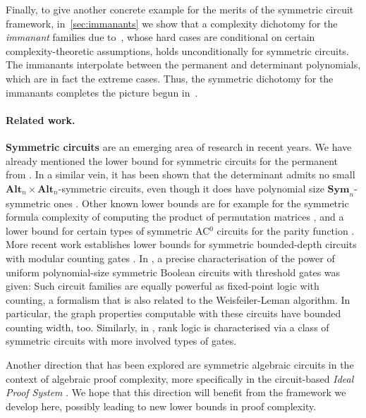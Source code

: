 \documentclass[11pt, DIV=15]{scrarticle}
\theoremstyle{definition}
\theoremstyle{plain}
\theoremstyle{remark}
\newcommand{\Sym}{\mathbf{Sym}}
\newcommand{\Alt}{\mathbf{Alt}}
\begin{document}
Finally, to give another concrete example for the merits of the
symmetric circuit framework, in~\cref{sec:immanants} we show that a
complexity dichotomy for the \emph{immanant} families due to~\cite{curticapean2021full}, whose hard cases are conditional on certain complexity-theoretic assumptions, holds unconditionally for symmetric circuits. The immanants interpolate between the permanent and determinant polynomials, which are in fact the extreme cases. 
Thus, the symmetric dichotomy for the immanants completes the picture begun in~\cite{dawar_symmetric_2025}.






\paragraph{Related work.}
\textbf{Symmetric circuits} are an emerging area of research in recent years. 
We have already mentioned the lower bound for symmetric circuits for the permanent from \cite{dawar_symmetric_2025}. 
In a similar vein, it has been shown that the determinant admits no small $\Alt_n \times \Alt_n$-symmetric circuits, even though it does have polynomial size $\Sym_n$-symmetric ones \cite{dawar2021lower}.
Other known lower bounds are for example for the symmetric formula complexity of computing the product of permutation matrices \cite{HeR23}, and a lower bound for certain types of symmetric AC$^0$ circuits for the parity function \cite{Rossman19}. More recent work establishes lower bounds for symmetric bounded-depth circuits with modular counting gates \cite{KawalekW25}. 
In \cite{anderson_symmetric_2017}, a precise characterisation of the power of uniform polynomial-size symmetric Boolean circuits with threshold gates was given: Such circuit families are equally powerful as fixed-point logic with counting, a formalism that is also related to the Weisfeiler-Leman algorithm. In particular, the graph properties computable with these circuits have bounded counting width, too. Similarly, in \cite{dawar_rank_logic}, rank logic is characterised via a class of symmetric circuits with more involved types of gates. 

Another direction that has been explored are symmetric algebraic circuits in the context of algebraic proof complexity, more specifically in the circuit-based \emph{Ideal Proof System} \cite{symIPS}. We hope that this direction will benefit from the framework we develop here, possibly leading to new lower bounds in proof complexity.
\end{document}
